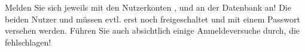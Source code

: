     \item Melden Sie sich jeweils mit den Nutzerkonten ,  und  an der Datenbank an! Die beiden Nutzer  und  m\"ussen evtl. erst noch freigeschaltet und mit einem Passwort versehen werden. F\"uhren Sie auch absichtlich einige Anmeldeversuche durch, die fehlschlagen!
